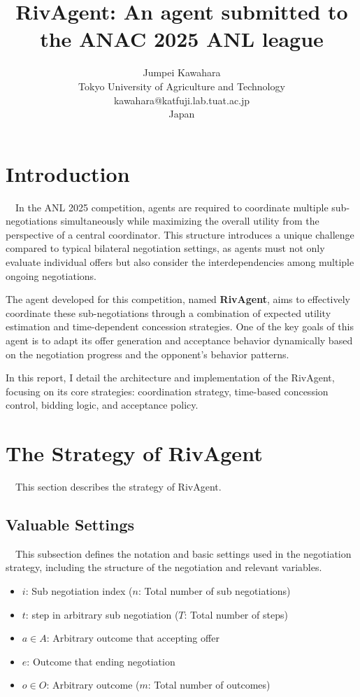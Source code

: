 \documentclass{article}
\title{RivAgent: An agent submitted to the ANAC 2025 ANL league}
\author{Jumpei Kawahara\\Tokyo University of Agriculture and Technology\\kawahara@katfuji.lab.tuat.ac.jp\\Japan}
\begin{document}
\maketitle
\section{Introduction}
　In the ANL 2025 competition, agents are required to coordinate multiple sub-negotiations simultaneously while maximizing the overall utility from the perspective of a central coordinator. 
This structure introduces a unique challenge compared to typical bilateral negotiation settings, as agents must not only evaluate individual offers but also consider the interdependencies among multiple ongoing negotiations.

The agent developed for this competition, named \textbf{RivAgent}, aims to effectively coordinate these sub-negotiations through a combination of expected utility estimation and time-dependent concession strategies. 
One of the key goals of this agent is to adapt its offer generation and acceptance behavior dynamically based on the negotiation progress and the opponent's behavior patterns.

In this report, I detail the architecture and implementation of the RivAgent, focusing on its core strategies: coordination strategy, time-based concession control, bidding logic, and acceptance policy.


\section{The Strategy of RivAgent}
　This section describes the strategy of RivAgent.

\subsection{Valuable Settings}
　This subsection defines the notation and basic settings used in the negotiation strategy, 
including the structure of the negotiation and relevant variables.

\begin{itemize}
	\item $i$: Sub negotiation index ($n$: Total number of sub negotiations)
	\item $t$: step in arbitrary sub negotiation ($T$: Total number of steps)
	\item $a\in A$: Arbitrary outcome that accepting offer
	\item $e$: Outcome that ending negotiation
	\item $o\in O$: Arbitrary outcome ($m$: Total number of outcomes)
\end{itemize}
\end{document}
